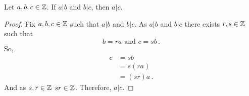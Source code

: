 \guard



\begin{prop}
\label{prop:dividesIsTransitive}
  Let $a,b,c\in\mathbb{Z}$.
  If $a\vert b$ and $b\vert c$, then $a\vert c$.
\end{prop}
\begin{proof}
  Fix $a,b,c\in\mathbb{Z}$ such that $a\vert b$ and $b\vert c$.
  As $a\vert b$ and $b\vert c$ there exists $r,s\in\mathbb{Z}$ such that \[b=ra\text{  and  }c=sb\,.\]
  So,
  \begin{align*}
    c &= sb \\
      &= s(ra) \\
      &= (sr)a \,.
  \end{align*}
  And as $s,r\in\mathbb{Z}$ $sr\in\mathbb{Z}$.
  Therefore, $a\vert c$.
\end{proof}
